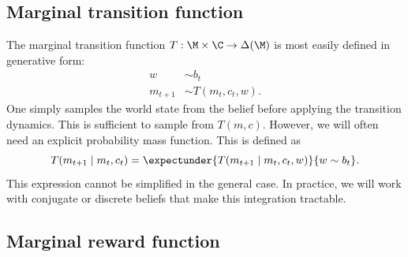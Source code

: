 \subsection{Marginal transition function}
The marginal transition function $T: \M \times \C \rightarrow \Delta(\M)$ is most easily defined in generative form:
%
\begin{equation}
\begin{aligned}
  w &\sim b_t\\
  m_{t+1} &\sim T(m_t, c_t, w).
\end{aligned}
\end{equation}
%
One simply samples the world state from the belief before applying the transition dynamics. This is sufficient to sample from $T(m, c)$. However, we will often need an explicit probability mass function. This is defined as
%
\begin{equation}\label{eq:marginal-transition}
T(m_{t+1} \mid m_t, c_t) = \expectunder{T(m_{t+1} \mid m_t, c_t, w)}{w \sim b_t}.
\end{equation}
This expression cannot be simplified in the general case. In practice, we will work with conjugate or discrete beliefs that make this integration tractable.

\subsection{Marginal reward function}

